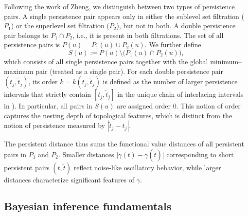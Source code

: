 \documentclass{ws-mplb}
\begin{document}
Following the work of Zheng\cite{Zheng2015}, we distinguish between two types of persistence pairs. 
A single persistence pair appears only in either the sublevel set filtration ($P_1$) or the superlevel set filtration ($P_2$), but not in both. 
A double persistence pair belongs to $P_1 \cap P_2$, i.e., it is present in both filtrations. 
The set of all persistence pairs is $P(u) = P_1(u) \cup P_2(u)$. 
We further define 
\[
S(u) := P(u) \setminus \bigl(P_1(u) \cap P_2(u)\bigr),
\]
which consists of all single persistence pairs together with the global minimum–maximum pair (treated as a single pair).
For each double persistence pair $(t_j, \tilde{t}_j)$, its order $k = k(t_j, \tilde{t}_j)$ is defined as the number of larger persistence intervals that strictly contain $[t_j, \tilde{t}_j]$ in the unique chain of interlacing intervals  in \cite{Zheng2015}). 
In particular, all pairs in $S(u)$ are assigned order $0$. 
This notion of order captures the nesting depth of topological features, which is distinct from the notion of persistence measured by $|\tilde{t}_j - t_j|$.


The persistent distance thus sums the functional value distances of all persistent pairs in \( P_1 \) and \( P_2 \). Smaller distances \( \vert \gamma(t) - \gamma(\tilde{t}) \vert \) corresponding to short persistent pairs \( (t, \tilde{t}) \) reflect noise-like oscillatory behavior, while larger distances characterize significant features of \( \gamma \).


\subsection{Bayesian inference fundamentals }
\end{document}
